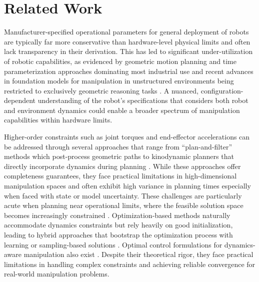 \vspace{-0.3in}
\section{Related Work}
\vspace{-0.14in}
Manufacturer-specified operational parameters for general deployment of robots are typically far more conservative than hardware-level physical limits and often lack transparency in their derivation.
This has led to significant under-utilization of robotic capabilities, as evidenced by geometric motion planning and time parameterization approaches dominating most industrial use \cite{berscheid2021jerk,coleman2014reducing,orthey2023sampling} and recent advances in foundation models for manipulation in unstructured environments being restricted to exclusively geometric reasoning tasks \cite{o2024open,team2024octo,zitkovich2023rt}.
A nuanced, configuration-dependent understanding of the robot’s specifications that considers both robot and environment dynamics could enable a broader spectrum of manipulation capabilities within hardware limits.

Higher-order constraints such as joint torques and end-effector accelerations can be addressed through several approaches that range from ``plan-and-filter'' methods which post-process geometric paths \cite{abderezaei2024clutter,kuntz2019fast} to kinodynamic planners that directly incorporate dynamics during planning \cite{li2015sparse,nayak2022bidirectional,pasricha2024virtues}.
While these approaches offer completeness guarantees, they face practical limitations in high-dimensional manipulation spaces and often exhibit high variance in planning times especially when faced with state or model uncertainty.
These challenges are particularly acute when planning near operational limits, where the feasible solution space becomes increasingly constrained \cite{kingston2018sampling}.
Optimization-based methods naturally accommodate dynamics constraints but rely heavily on good initialization, leading to hybrid approaches that bootstrap the optimization process with learning or sampling-based solutions \cite{ichnowski2020deep,kuntz2019fast,yan2024impact}.
Optimal control formulations for dynamics-aware manipulation also exist \cite{arrizabalaga2024slosh,kim2014catching}. Despite their theoretical rigor, they face practical limitations in handling complex constraints and achieving reliable convergence for real-world manipulation problems.

